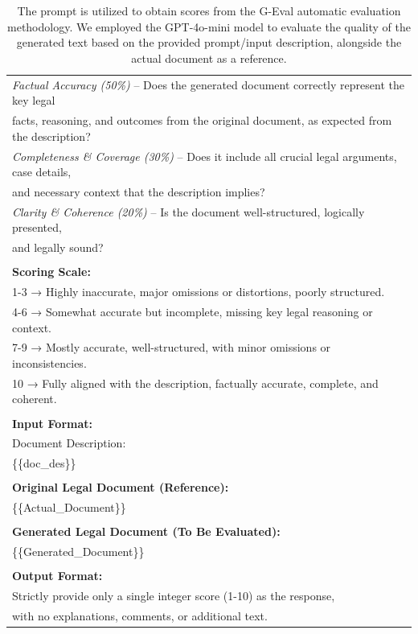 \begin{table}[ht]
\begin{tabular}{|l|}
\textit{Factual Accuracy (50\%)} – Does the generated document correctly represent the key legal\\ facts, reasoning, and outcomes from the original document, as expected from the description?\\
\textit{Completeness \& Coverage (30\%)} – Does it include all crucial legal arguments, case details,\\ and necessary context that the description implies?\\
\textit{Clarity \& Coherence (20\%)} – Is the document well-structured, logically presented,\\ and legally sound?\\
\\
\textbf{Scoring Scale:}\\
1-3 → Highly inaccurate, major omissions or distortions, poorly structured.\\
4-6 → Somewhat accurate but incomplete, missing key legal reasoning or context.\\
7-9 → Mostly accurate, well-structured, with minor omissions or inconsistencies.\\
10 → Fully aligned with the description, factually accurate, complete, and coherent.\\
\\
\textbf{Input Format:}\\
Document Description:\\
\{\{doc\_des\}\}\\
\\
\textbf{Original Legal Document (Reference):}\\
\{\{Actual\_Document\}\}\\
\\
\textbf{Generated Legal Document (To Be Evaluated):}\\
\{\{Generated\_Document\}\}\\
\\
\textbf{Output Format:}\\
Strictly provide only a single integer score (1-10) as the response,\\with no explanations, comments, or additional text.\\
\hline
\end{tabular}
\caption{The prompt is utilized to obtain scores from the G-Eval automatic evaluation methodology. We employed the GPT-4o-mini model to evaluate the quality of the generated text based on the provided prompt/input description, alongside the actual document as a reference.}
\label{tab:G-Eval Prompt}
\end{table}

